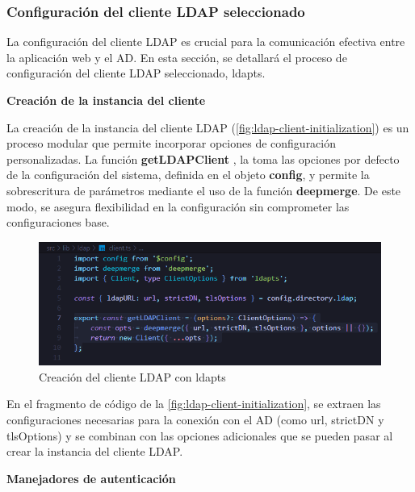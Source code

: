 \subsubsection{Configuración del cliente LDAP seleccionado}

La configuración del cliente LDAP es crucial para la comunicación efectiva entre la aplicación web y el AD. En esta sección, se detallará el proceso de configuración del cliente LDAP seleccionado, ldapts.

\textbf{Creación de la instancia del cliente}

La creación de la instancia del cliente LDAP (\autoref{fig:ldap-client-initialization}) es un proceso modular que permite incorporar opciones de configuración personalizadas. La función \textbf{getLDAPClient} , la toma las opciones por defecto de la configuración del sistema, definida en el objeto \textbf{config}, y permite la sobrescritura de parámetros mediante el uso de la función \textbf{deepmerge}. De este modo, se asegura flexibilidad en la configuración sin comprometer las configuraciones base.

\begin{figure}[h]
    \centering
    \includegraphics[width=\linewidth]{images/code/ldap-client-initialization.png}
    \caption{Creación del cliente LDAP con ldapts}
    \label{fig:ldap-client-initialization}
\end{figure}

En el fragmento de código de la \autoref{fig:ldap-client-initialization}, se extraen las configuraciones necesarias para la conexión con el AD (como url, strictDN y tlsOptions) y se combinan con las opciones adicionales que se pueden pasar al crear la instancia del cliente LDAP.

\textbf{Manejadores de autenticación}

